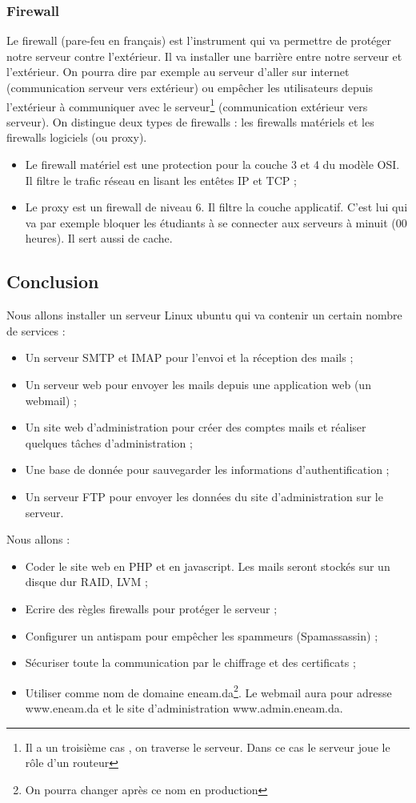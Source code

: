 \documentclass[a4paper,12pt,french]{report} %
\begin{document}
\subsubsection{Firewall}
Le firewall (pare-feu en français) est l'instrument qui va permettre de protéger notre serveur contre l'extérieur. Il va installer une barrière entre notre serveur et l'extérieur. On pourra dire par exemple au serveur d'aller sur internet (communication serveur vers extérieur) ou empêcher les utilisateurs depuis l'extérieur à communiquer avec le serveur\footnote{Il a un troisième cas , on traverse le serveur. Dans ce cas le serveur joue le rôle d'un routeur} (communication extérieur vers serveur). On distingue deux types de firewalls : les firewalls matériels et les firewalls logiciels (ou proxy).
\begin{itemize}
\item Le firewall matériel est une protection pour la couche 3 et 4 du modèle OSI. Il filtre le trafic réseau en lisant les entêtes IP et TCP ;
\item Le proxy est un firewall de niveau 6. Il filtre la couche applicatif. C'est lui qui va par exemple bloquer les étudiants à se connecter aux serveurs à minuit (00 heures). Il sert aussi de cache.
\end{itemize}

\subsection*{Conclusion}
Nous allons installer un serveur Linux ubuntu qui va contenir un certain nombre de services :
\begin{itemize}
	\item  Un serveur SMTP et IMAP pour l'envoi et la réception des mails ;
	\item  Un serveur web pour envoyer les mails depuis une application web (un webmail) ;
	\item  Un site web d'administration pour créer des comptes mails et réaliser quelques tâches d'administration ;
	\item Une base de donnée pour sauvegarder les informations d'authentification ; 
	\item Un serveur FTP pour envoyer les données du site d'administration sur le serveur.
\end{itemize}
Nous allons :
\begin{itemize}
	\item Coder le site web en PHP et en javascript. Les mails seront stockés sur un disque dur RAID\label{ref:raid}, LVM\label{ref:lvm} ;
	\item Ecrire des règles firewalls pour protéger le serveur ;
	\item  Configurer un antispam pour empêcher les spammeurs (Spamassassin) ;
	\item Sécuriser toute la communication par le chiffrage et des certificats ;
	\item Utiliser comme nom de domaine eneam.da\footnote{On pourra changer après ce nom en production}. Le webmail aura pour adresse www.eneam.da et le site d'administration www.admin.eneam.da.
\end{itemize}
\end{document}
